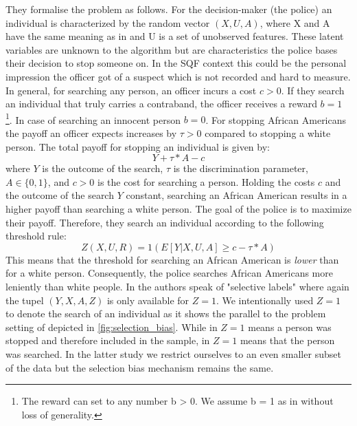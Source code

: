 They formalise the problem as follows. For the decision-maker (the police) an individual is characterized by the random vector $(X, U, A)$, where X and A have the same meaning as in \cite{kallus2018}
and U is a set of unobserved features. These latent variables are unknown to the algorithm but are characteristics the police bases their decision to stop someone on. In the SQF context this could be the personal impression the officer got of a suspect which is not recorded and hard to measure.
In general, for searching any person, an officer incurs a cost $c > 0$. If they search an individual that truly carries a contraband, the officer receives a reward $b = 1$ \footnote{The reward can set to any number b > 0. We assume b = 1 as in \cite{RambachanBBOEFW} without loss of generality.}. In case of searching an innocent person $b = 0$.
For stopping African Americans the payoff an officer expects increases by $\tau > 0$ compared to stopping a white person. The total payoff for stopping an individual is given by:
$$Y + \tau * A - c$$
where $Y$ is the outcome of the search, $\tau$ is the discrimination parameter, $A \in \{0,1\}$, and $c > 0$ is the cost for searching a person.
Holding the costs $c$ and the outcome of the search $Y$ constant, searching an African American results in a higher payoff than searching a white person. The goal of the police is to maximize their payoff. Therefore, they search an individual according to the following threshold rule:
$$Z(X, U, R) = 1(E[Y|X, U, A] \ge c - \tau * A)$$
This means that the threshold for searching an African American is \textit{lower} than for a white person. Consequently, the police searches African Americans more leniently than white people.
In \cite{RambachanBBOEFW} the authors speak of "selective labels" where again the tupel $(Y, X, A, Z)$ is only available for $Z = 1$. We intentionally used $Z = 1$ to denote the search of an individual as it shows the parallel to the problem setting of \cite{kallus2018} depicted in \autoref{fig:selection_bias}. While in \cite{kallus2018} $Z = 1$ means a person was stopped and therefore included in the sample, in \cite{RambachanBBOEFW} $Z = 1$ means that the person was searched. In the latter study we restrict ourselves to an even smaller subset of the data but the selection bias mechanism remains the same.\\

